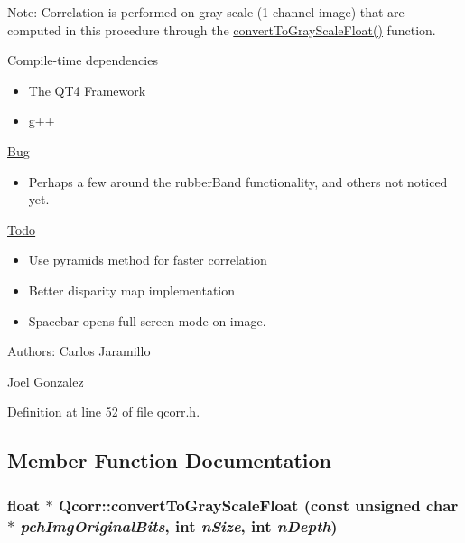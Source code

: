 \begin{Desc}
\item[Note:]Correlation is performed on gray-scale (1 channel image) that are computed in this procedure through the \hyperlink{classQcorr_d1b26ace597c0c4a0f64a0bd9576d4fc}{convertToGrayScaleFloat()} function.\end{Desc}
\begin{Desc}
\item[Compile-time dependencies]\begin{itemize}
\item The QT4 Framework\item g++\end{itemize}
\end{Desc}
\begin{Desc}
\item[\hyperlink{bug__bug000001}{Bug}]\begin{itemize}
\item Perhaps a few around the rubberBand functionality, and others not noticed yet.\end{itemize}
\end{Desc}
\begin{Desc}
\item[\hyperlink{todo__todo000001}{Todo}]\begin{itemize}
\item Use pyramids method for faster correlation\item Better disparity map implementation\item Spacebar opens full screen mode on image.\end{itemize}
\end{Desc}
\begin{Desc}
\item[Authors:]Carlos Jaramillo 

Joel Gonzalez \end{Desc}


Definition at line 52 of file qcorr.h.

\subsection{Member Function Documentation}
\hypertarget{classQcorr_d1b26ace597c0c4a0f64a0bd9576d4fc}{
\subsubsection[{convertToGrayScaleFloat}]{\setlength{\rightskip}{0pt plus 5cm}float $\ast$ Qcorr::convertToGrayScaleFloat (const unsigned char $\ast$ {\em pchImgOriginalBits}, \/  int {\em nSize}, \/  int {\em nDepth})}}
\label{classQcorr_d1b26ace597c0c4a0f64a0bd9576d4fc}


